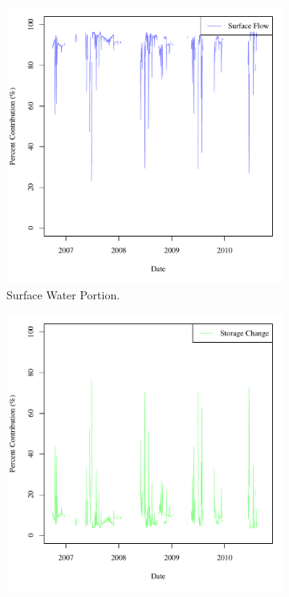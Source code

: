 \begin{figure}[htbp]
	\centering
	\begin{subfigure}{0.5\textwidth}
		\centering
		\includegraphics[width=\tableCustomSize]{"Figures/Results_DSR/Stochastic/M Mass Contrib 1"}
		\caption{Surface Water Portion.}
	\end{subfigure}%
	\begin{subfigure}{0.5\textwidth}
		\centering
		\includegraphics[width=\tableCustomSize]{"Figures/Results_DSR/Stochastic/M Mass Contrib 2"}

\end{subfigure}
\end{figure}
